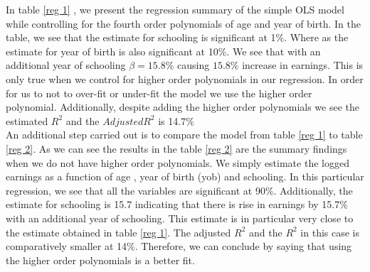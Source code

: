 \documentclass[a4paper,12pt,oneside,English]{article}
\begin{document}
In table \ref{reg 1} , we present the regression summary of the simple OLS model while controlling for the fourth order polynomials of age and year of birth. In the table, we see that the estimate for schooling is significant at 1\%. Where as the estimate for year of birth is also significant at 10\%. We see that with an additional year of schooling $\beta = 15.8$\% causing $15.8\%$ increase in earnings. This is only true when we control for higher order polynomials in our regression. In order for us to not to over-fit or under-fit the model we use the higher order polynomial. Additionally, despite adding the higher order polynomials we see the estimated $R^2$ and the $Adjusted R^2$ is 14.7\%\\

An additional step carried out is to compare the model from table \ref{reg 1} to table \ref{reg 2}. As we can see the results in the table \ref{reg 2}
are the summary findings when we do not have higher order polynomials. We simply estimate the logged earnings as a function of age , year of birth (yob) and schooling. In this particular regression, we see that all the variables are significant at 90\%. Additionally, the estimate for schooling is 15.7 indicating that there is rise in earnings by 15.7\% with an additional year of schooling. This estimate is in particular very close to the estimate obtained in table \ref{reg 1}. The adjusted $R^2$ and the $R^2$ in this case is comparatively smaller at 14\%. Therefore, we can conclude by saying that using the higher order polynomials is a better fit.\\
\end{document}
